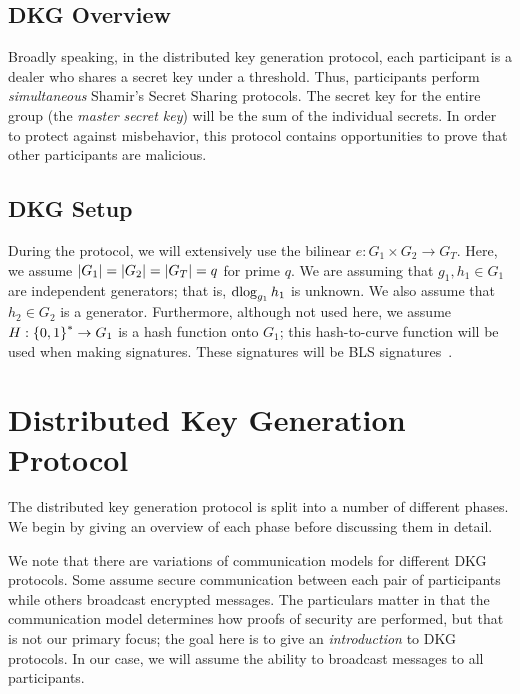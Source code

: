 \subsection{DKG Overview}

Broadly speaking, in the \gls{distributed key generation}  protocol,
each participant is a dealer
who shares a secret key under a threshold.
Thus, participants perform \emph{simultaneous}
Shamir's Secret Sharing protocols.
The secret key for the entire group (the \emph{master secret key})
will be the sum of the individual secrets.
In order to protect against misbehavior,
this protocol contains opportunities to prove that other
participants are malicious.

\subsection{DKG Setup}

During the protocol,
we will extensively use the \gls{bilinear} $e:G_{1}\times G_{2}\to G_{T}$.
Here, we assume $\left| G_{1} \right| = \left| G_{2} \right| = \left| G_{T} \right| = q$ for prime $q$.
We are assuming that $g_{1}, h_{1}\in G_{1}$ are independent generators;
that is, $\operatorname{dlog}_{g_{1}}h_{1}$ is unknown.
We also assume that $h_{2}\in G_{2}$ is a generator.
Furthermore, although not used here, we assume $H:\left\{ 0,1 \right\}^{*}\to G_{1}$
is a \gls{hash function} onto $G_{1}$;
this hash-to-curve function will be used when making \glspl{signature}.
These signatures will be BLS signatures~\cite{BLSSignatures}.



\section{Distributed Key Generation Protocol}
\label{sec:ss_dkg_protocol}

The \gls{distributed key generation}  protocol is split into a number
of different phases.
We begin by giving an overview of each phase before discussing them
in detail.

We note that there are variations of communication models
for different DKG protocols.
Some assume secure communication between each pair of participants
while others broadcast encrypted messages.
The particulars matter in that the communication model determines how
proofs of security are performed, but that is not our primary focus;
the goal here is to give an \emph{introduction} to DKG protocols.
In our case, we will assume the ability to broadcast messages
to all participants.

